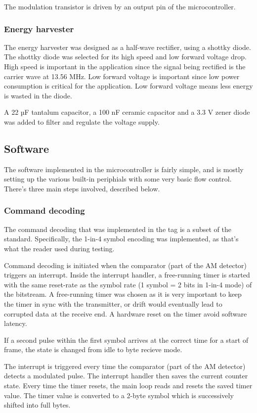 The modulation transistor is driven by an output pin of the microcontroller.

\subsubsection{Energy harvester}
The energy harvester was designed as a half-wave rectifier, using a shottky diode.
The shottky diode was selected for its high speed and low forward voltage drop.
High speed is important in the application since the signal being rectified is the carrier wave at 13.56 MHz.
Low forward voltage is important since low power consumption is critical for the application.
Low forward voltage means less energy is wasted in the diode.

A 22 µF tantalum capacitor, a 100 nF ceramic capacitor and a 3.3 V zener diode was added to filter and regulate the voltage supply.

\subsection{Software}
The software implemented in the microcontroller is fairly simple, and is mostly setting up the various built-in
periphials with some very basic flow control. There's three main steps involved, described below.

\subsubsection{Command decoding}
The command decoding that was implemented in the tag is a subset of the standard. Specifically, the
1-in-4 symbol encoding was implemented, as that's what the reader used during testing.

Command decoding is initiated when the comparator (part of the AM detector) triggers an interrupt. Inside the interrupt handler,
a free-running timer is started with the same reset-rate as the symbol rate (1 symbol = 2 bits in 1-in-4 mode)
of the bitstream. A free-running timer was chosen as it is very important to keep the timer in sync with
the transmitter, or drift would eventually lead to corrupted data at the receive end. A hardware
reset on the timer avoid software latency.

If a second pulse within the first symbol arrives at the correct time for a start of frame, the state is
changed from idle to byte recieve mode.

The interrupt is triggered every time the comparator (part of the AM detector) detects a modulated pulse. The interrupt handler then
saves the current counter state. Every time the timer resets, the main loop reads and resets the saved timer
value. The timer value is converted to a 2-byte symbol which is successively shifted into full bytes.

